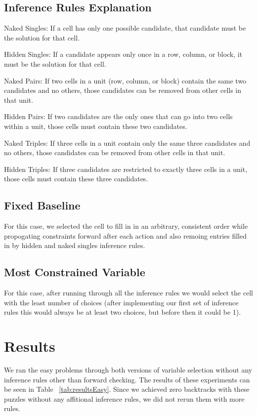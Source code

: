 \documentclass{article}
\begin{document}
\subsection{Inference Rules Explanation
}
{Naked Singles: If a cell has only one possible candidate, that candidate must be the solution for that cell.}

{Hidden Singles: If a candidate appears only once in a row, column, or block, it must be the solution for that cell.}

{Naked Pairs: If two cells in a unit (row, column, or block) contain the same two candidates and no others, those candidates can be removed from other cells in that unit.}

{Hidden Pairs: If two candidates are the only ones that can go into two cells within a unit, those cells must contain these two candidates.}

{Naked Triples: If three cells in a unit contain only the same three candidates and no others, those candidates can be removed from other cells in that unit.}

{Hidden Triples: If three candidates are restricted to exactly three cells in a unit, those cells must contain these three candidates.}


\subsection{Fixed  Baseline}
For this case, we selected the  cell to fill in in an arbitrary, consistent order while propogating constraints forward after each action and also remoing entries filled in by hidden and naked singles inference rules. 
\subsection{Most Constrained Variable}
For this case, after running through all the inference rules we would select the cell with the least number of choices (after implementing our first set of inference rules this would always be at least two choices, but before then it could be 1). 

\section{Results}
We ran the easy problems through both versions of variable selection without any inference rules other than forward checking. The results of these experiments can be seen in Table ~\ref{tab:resultsEasy}. Since we achieved zero backtracks with these puzzles without any affitional inference rules, we did not rerun them with more rules.
\end{document}
